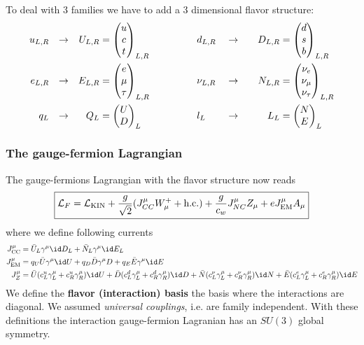 \documentclass[TheoreticalPhy_ModB.tex]{subfiles}
\begin{document}
To deal with 3 families we have to add a 3 dimensional flavor structure:
\[\begin{aligned}
u_{L,R}&&\to&&U_{L,R}&=\begin{pmatrix}u\\c\\t\end{pmatrix}_{L,R}
&&\hspace{1cm}&&
d_{L,R}&&\to&&&D_{L,R}&=\begin{pmatrix}d\\s\\b\end{pmatrix}_{L,R}\\
e_{L,R}&&\to&&E_{L,R}&=\begin{pmatrix}e\\\mu\\\tau\end{pmatrix}_{L,R}
&&\hspace{1cm}&&
\nu_{L,R}&&\to&&&N_{L,R}&=\begin{pmatrix}\nu_e\\\nu_\mu\\\nu_\tau\end{pmatrix}_{L,R}\\
q_L&&\to&&Q_L&=\begin{pmatrix}U\\D\end{pmatrix}_L
&&\hspace{1cm}&&
l_L&&\to&&&L_L&=\begin{pmatrix}N\\E\end{pmatrix}_L
\end{aligned}\]

\subsubsection{The gauge-fermion Lagrangian}

The gauge-fermions Lagrangian with the flavor structure now reads
\[\boxed{
\mathcal L_F=\mathcal L_{\text{KIN}}+\frac g{\sqrt2}(J_{CC}^\mu W_\mu^++\text{h.c.})+\frac g{c_w}J_{NC}^\mu Z_\mu+eJ_{\text{EM}}^\mu A_\mu
}\]
where we define following currents
\[\begin{aligned}
J_{\text{CC}}^\mu&=\bar U_L\gamma^\mu\id D_L+\bar N_L\gamma^\mu\id E_L\\
J_{\text{EM}}^\mu&=q_U\bar U\gamma^\mu\id U+q_D\bar D\gamma^\mu D+q_E\bar E\gamma^\mu\id E\\
J_Z^\mu&=\bar U(c_L^u\gamma^\mu_L+c_R^u\gamma_R^\mu)\id U+\bar D(c_L^d\gamma^\mu_L+c_R^d\gamma_R^\mu)\id D+\bar N(c_L^\nu\gamma^\mu_L+c_R^\nu\gamma_R^\mu)\id N+\bar E(c_L^e\gamma^\mu_L+c_R^e\gamma_R^\mu)\id E
\end{aligned}\]
We define the \textbf{flavor (interaction) basis} the basis where the interactions are diagonal. We assumed \emph{universal couplings}, i.e. are family independent. With these definitions the interaction gauge-fermion Lagranian has an $SU(3)$ global symmetry. 
\end{document}
